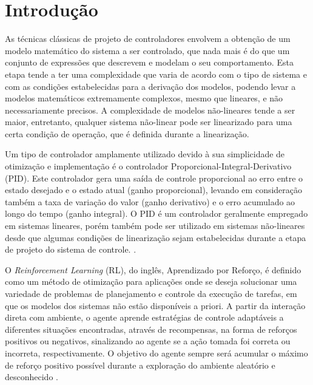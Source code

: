 \documentclass[a4paper]{ifacconf}
\begin{document}
\section{Introdução}

As técnicas clássicas de projeto de controladores envolvem a obtenção de um modelo matemático do sistema a ser controlado, que nada mais é do que um conjunto de expressões que descrevem e modelam o seu comportamento. Esta etapa tende a ter uma complexidade que varia de acordo com o tipo de sistema e com as condições estabelecidas para a derivação dos modelos, podendo levar a modelos matemáticos extremamente complexos, mesmo que lineares, e não necessariamente precisos. A complexidade de modelos não-lineares tende a ser maior, entretanto, qualquer sistema não-linear pode ser linearizado para uma certa condição de operação, que é definida durante a linearização.

Um tipo de controlador amplamente utilizado devido à sua simplicidade de otimização e implementação é o controlador Proporcional-Integral-Derivativo (PID). Este controlador gera uma saída de controle proporcional ao erro entre o estado desejado e o estado atual (ganho proporcional), levando em consideração também a taxa de variação do valor (ganho derivativo) e o erro acumulado ao longo do tempo (ganho integral). O PID é um controlador geralmente empregado em sistemas lineares, porém também pode ser utilizado em sistemas não-lineares \cite{nonLinearPID} desde que algumas condições de linearização sejam estabelecidas durante a etapa de projeto do sistema de controle. \cite{pid_autotune_relay, pid_engine_tuning,embarcados_pid_1}.

O \emph{Reinforcement Learning} (RL), do inglês, Aprendizado por Reforço, é definido como um método de otimização para aplicações onde se deseja solucionar uma variedade de problemas de planejamento e controle da execução de tarefas, em que os modelos dos sistemas não estão disponíveis a priori. A partir da interação direta com ambiente, o agente aprende estratégias de controle adaptáveis a diferentes situações encontradas, através de recompensas, na forma de reforços positivos ou negativos, sinalizando ao agente se a ação tomada foi correta ou incorreta, respectivamente. O objetivo do agente sempre será acumular o máximo de reforço positivo possível durante a exploração do ambiente aleatório e desconhecido \cite{ql_pid_robotics,intro_to_rl,rl_rob_survey,ql_pid_robotics}.
\end{document}
